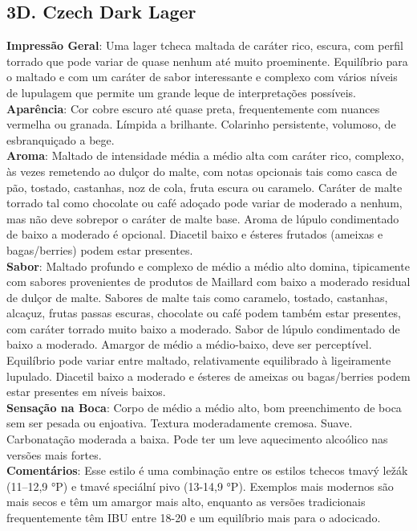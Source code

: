 \subsection*{3D. Czech Dark Lager}
\textbf{Impressão Geral}: Uma lager tcheca maltada de caráter rico, escura, com perfil torrado que pode variar de quase nenhum até muito proeminente. Equilíbrio para o maltado e com um caráter de sabor interessante e complexo com vários níveis de lupulagem que permite um grande leque de interpretações possíveis. \\
\textbf{Aparência}: Cor cobre escuro até quase preta, frequentemente com nuances vermelha ou granada. Límpida a brilhante. Colarinho persistente, volumoso, de esbranquiçado a bege. \\
\textbf{Aroma}: Maltado de intensidade média a médio alta com caráter rico, complexo, às vezes remetendo ao dulçor do malte, com notas opcionais tais como casca de pão, tostado, castanhas, noz de cola, fruta escura ou caramelo. Caráter de malte torrado tal como chocolate ou café adoçado pode variar de moderado a nenhum, mas não deve sobrepor o caráter de malte base. Aroma de lúpulo condimentado de baixo a moderado é opcional. Diacetil baixo e ésteres frutados (ameixas e bagas/berries) podem estar presentes. \\
\textbf{Sabor}: Maltado profundo e complexo de médio a médio alto domina, tipicamente com sabores provenientes de produtos de Maillard com baixo a moderado residual de dulçor de malte. Sabores de malte tais como caramelo, tostado, castanhas, alcaçuz, frutas passas escuras, chocolate ou café podem também estar presentes, com caráter torrado muito baixo a moderado. Sabor de lúpulo condimentado de baixo a moderado. Amargor de médio a médio-baixo, deve ser perceptível. Equilíbrio pode variar entre maltado, relativamente equilibrado à ligeiramente lupulado. Diacetil baixo a moderado e ésteres de ameixas ou bagas/berries podem estar presentes em níveis baixos. \\
\textbf{Sensação na Boca}: Corpo de médio a médio alto, bom preenchimento de boca sem ser pesada ou enjoativa. Textura moderadamente cremosa. Suave. Carbonatação moderada a baixa. Pode ter um leve aquecimento alcoólico nas versões mais fortes. \\
\textbf{Comentários}: Esse estilo é uma combinação entre os estilos tchecos tmavý ležák (11–12,9 °P) e tmavé speciální pivo (13-14,9 °P). Exemplos mais modernos são mais secos e têm um amargor mais alto, enquanto as versões tradicionais frequentemente têm IBU entre 18-20 e um equilíbrio mais para o adocicado. \\
